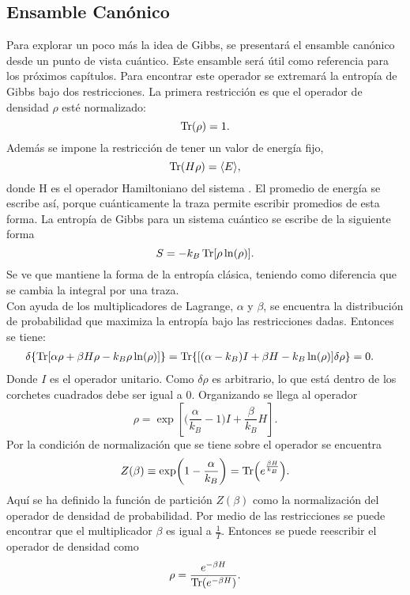 \subsection{Ensamble Canónico}
Para explorar un poco más la idea de Gibbs, se presentará el ensamble canónico desde un punto de vista cuántico. Este ensamble será útil como referencia para los próximos capítulos. Para encontrar este operador se extremará la entropía de Gibbs bajo dos restricciones. La primera restricción es que el operador de densidad $\rho$ esté normalizado:
\begin{equation}
\Tr(\rho)=1.
\end{equation}
Además se impone la restricción de tener un valor de energía fijo,
\begin{equation}
\Tr(H \rho)= \langle E \rangle,
\end{equation}
donde H  es el operador Hamiltoniano del sistema  \cite{ReichlStat}. El promedio de energía se escribe así, porque cuánticamente la traza permite escribir promedios de esta forma. La entropía de Gibbs para un sistema cuántico se escribe de la siguiente forma
\begin{equation}
S=-k_{B} \Tr[\rho \ln (\rho)].
\end{equation}
Se ve que mantiene la forma de la entropía clásica, teniendo como diferencia que se cambia la integral por una traza. \\
Con ayuda de los multiplicadores de Lagrange, $\alpha$ y $\beta$, se encuentra la distribución de probabilidad que maximiza la entropía bajo las restricciones dadas. Entonces se tiene:
\begin{align}
\delta \{ \Tr [ \alpha \rho + \beta H \rho - k_{B} \rho \ln (\rho)] \} 
&= \Tr \{ [(\alpha - k_{B})I + \beta H - k_{B} \ln (\rho) ] \delta \rho \}=0.
\end{align}
Donde $I$ es el operador unitario. Como $\delta \rho$ es arbitrario, lo que está dentro de los corchetes cuadrados debe ser igual a 0. Organizando se llega al operador
\begin{equation}
\rho= \exp [ \bigg( \frac{ \alpha }{k_{B}}-1 \bigg) I + \frac{\beta}{k_{B}}H ].
\end{equation}
Por la condición de normalización que se tiene sobre el operador se encuentra
\begin{equation}
Z(\beta) \equiv \exp (1- \frac{ \alpha }{k_{B}}) = \Tr (e^{\frac{\beta H}{k_{B}}}).
\end{equation}
Aquí se ha definido la función de partición $Z(\beta)$ como la normalización del operador de densidad de probabilidad. Por medio de las restricciones se puede encontrar que el multiplicador $\beta$ es igual a $\frac{1}{T}$. Entonces se puede reescribir el operador de densidad  como
\begin{equation}
\rho = \frac{ e^{-\beta H}}{\Tr( e^{-\beta H})}.
\end{equation}

